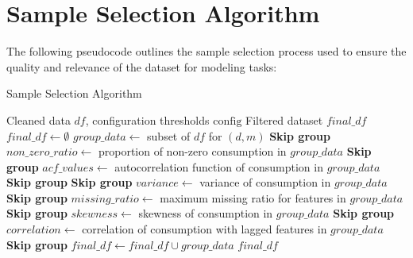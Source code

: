 \documentclass[12pt]{article}
\begin{document}
\raggedbottom  %

\appendix
\section{Sample Selection Algorithm}
\label{appendix:sample-selection}

The following pseudocode outlines the sample selection process used to ensure the quality and relevance of the dataset for modeling tasks:

\begin{algorithm}[H]
\caption{Sample Selection Algorithm}
\begin{algorithmic}[1]
\Require Cleaned data $df$, configuration thresholds $\text{config}$
\Ensure Filtered dataset $final\_df$
\State $final\_df \gets \emptyset$
    \State $group\_data \gets$ subset of $df$ for $(d, m)$
        \State \textbf{Skip group} 
    \EndIf
    \State $non\_zero\_ratio \gets$ proportion of non-zero consumption in $group\_data$
        \State \textbf{Skip group} 
    \EndIf
    \State $acf\_values \gets$ autocorrelation function of consumption in $group\_data$
        \State \textbf{Skip group} 
    \EndIf
        \State \textbf{Skip group} 
    \EndIf
    \State $variance \gets$ variance of consumption in $group\_data$
        \State \textbf{Skip group} 
    \EndIf
    \State $missing\_ratio \gets$ maximum missing ratio for features in $group\_data$
        \State \textbf{Skip group} 
    \EndIf
    \State $skewness \gets$ skewness of consumption in $group\_data$
        \State \textbf{Skip group} 
    \EndIf
    \State $correlation \gets$ correlation of consumption with lagged features in $group\_data$
        \State \textbf{Skip group} 
    \EndIf
    \State $final\_df \gets final\_df \cup group\_data$
\EndFor
\State \Return $final\_df$
\end{algorithmic}
\end{algorithm}
\end{document}
